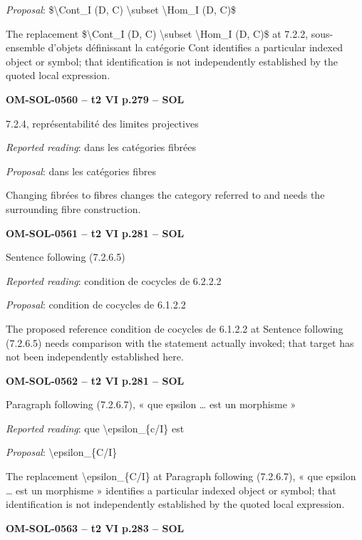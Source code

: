 \emph{Proposal}: \$\textbackslash{}Cont\_I (D, C) \textbackslash{}subset \textbackslash{}Hom\_I (D, C)\$\par
The replacement \$\textbackslash{}Cont\_I (D, C) \textbackslash{}subset \textbackslash{}Hom\_I (D, C)\$ at 7.2.2, sous-ensemble d'objets définissant la catégorie Cont identifies a particular indexed object or symbol; that identification is not independently established by the quoted local expression.\par
\par\noindent\textbf{OM-SOL-0560 -- t2 VI p.279 -- SOL}\par
7.2.4, représentabilité des limites projectives\par
\emph{Reported reading}: dans les catégories fibrées\par
\emph{Proposal}: dans les catégories fibres\par
Changing fibrées to fibres changes the category referred to and needs the surrounding fibre construction.\par
\par\noindent\textbf{OM-SOL-0561 -- t2 VI p.281 -- SOL}\par
Sentence following (7.2.6.5)\par
\emph{Reported reading}: condition de cocycles de 6.2.2.2\par
\emph{Proposal}: condition de cocycles de 6.1.2.2\par
The proposed reference condition de cocycles de 6.1.2.2 at Sentence following (7.2.6.5) needs comparison with the statement actually invoked; that target has not been independently established here.\par
\par\noindent\textbf{OM-SOL-0562 -- t2 VI p.281 -- SOL}\par
Paragraph following (7.2.6.7), « que epsilon … est un morphisme »\par
\emph{Reported reading}: que \textbackslash{}epsilon\_\{c/I\} est\par
\emph{Proposal}: \textbackslash{}epsilon\_\{C/I\}\par
The replacement \textbackslash{}epsilon\_\{C/I\} at Paragraph following (7.2.6.7), « que epsilon … est un morphisme » identifies a particular indexed object or symbol; that identification is not independently established by the quoted local expression.\par
\par\noindent\textbf{OM-SOL-0563 -- t2 VI p.283 -- SOL}\par
